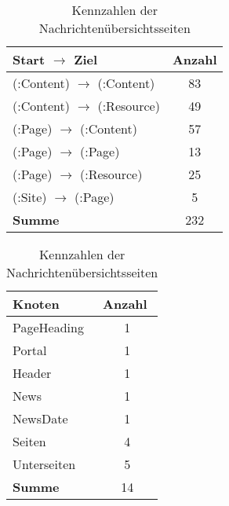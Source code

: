 \begin{table}[htb]
        \begin{subtable}[c]{0.5\textwidth}
            \centering
            \begin{tabular}{|l|c|}
                \hline
                \textbf{Start $\rightarrow$ Ziel} & \multicolumn{1}{l|}{\textbf{Anzahl}} \\ \hline
                (:Content) $\rightarrow$ (:Content)     & 83                                   \\ \hline
                (:Content) $\rightarrow$ (:Resource)    & 49                                   \\ \hline
                (:Page) $\rightarrow$ (:Content)        & 57                                   \\ \hline
                (:Page) $\rightarrow$ (:Page)           & 13                                   \\ \hline
                (:Page) $\rightarrow$ (:Resource)       & 25                                   \\ \hline
                (:Site) $\rightarrow$ (:Page)           & 5                                    \\ \hline
                \textbf{Summe}                    & 232                                  \\ \hline
            \end{tabular}
            \label{table:findingsTeachersFiguresEdgesByStartEndNodeLabel}
        \end{subtable}
        \begin{subtable}[c]{0.5\textwidth}
            \centering
            \begin{tabular}{|l|c|}
                \hline
                \textbf{Knoten} & \multicolumn{1}{l|}{\textbf{Anzahl}} \\ \hline
                PageHeading     & 1                                    \\ \hline
                Portal          & 1                                    \\ \hline
                Header          & 1                                    \\ \hline
                News            & 1                                    \\ \hline
                NewsDate        & 1                                    \\ \hline
                Seiten          & 4                                    \\ \hline
                Unterseiten     & 5                                    \\ \hline
                \textbf{Summe}  & 14                                   \\ \hline
                \end{tabular}
            \label{table:findingsNewsFiguresSharedNodes}
        \end{subtable}
        \label{table:findingsNewsFigures}
        \caption{Kennzahlen der Nachrichtenübersichtsseiten}
    \end{table}